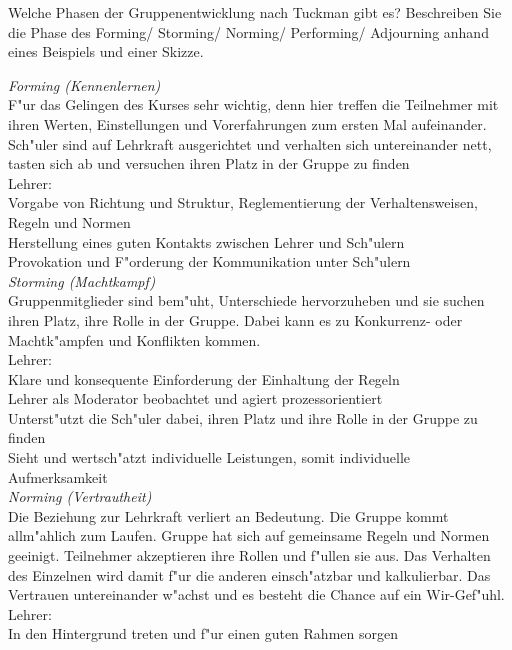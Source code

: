 \begin{question}{6}
Welche Phasen der Gruppenentwicklung nach Tuckman gibt es? Beschreiben Sie die Phase des Forming/ Storming/ Norming/ Performing/ Adjourning anhand eines Beispiels und einer Skizze.
\end{question}
\begin{solution}
\emph{Forming (Kennenlernen)}\\
F"ur das Gelingen des Kurses sehr wichtig, denn hier treffen die Teilnehmer mit ihren Werten, Einstellungen und Vorerfahrungen zum ersten Mal aufeinander.\\
Sch"uler sind auf Lehrkraft ausgerichtet und verhalten sich untereinander nett, tasten sich ab und versuchen ihren Platz in der Gruppe zu finden\\
Lehrer:\\
Vorgabe von Richtung und Struktur, Reglementierung der Verhaltensweisen, Regeln und Normen\\
Herstellung eines guten Kontakts zwischen Lehrer und Sch"ulern\\
Provokation und F"orderung der Kommunikation unter Sch"ulern\\ 
\emph{Storming (Machtkampf)}\\
Gruppenmitglieder sind bem"uht, Unterschiede hervorzuheben und sie suchen ihren Platz, ihre Rolle in der Gruppe. Dabei kann es zu Konkurrenz- oder Machtk"ampfen und Konflikten kommen.\\
Lehrer:\\
Klare und konsequente Einforderung der Einhaltung der Regeln\\
Lehrer als Moderator beobachtet und agiert prozessorientiert\\
Unterst"utzt die Sch"uler dabei, ihren Platz und ihre Rolle in der Gruppe zu finden\\
Sieht und wertsch"atzt individuelle Leistungen, somit individuelle Aufmerksamkeit\\
\emph{Norming (Vertrautheit)}\\
Die Beziehung zur Lehrkraft verliert an Bedeutung. Die Gruppe kommt allm"ahlich zum Laufen. Gruppe hat sich auf gemeinsame Regeln und Normen geeinigt. Teilnehmer akzeptieren ihre Rollen und f"ullen sie aus. Das Verhalten des Einzelnen wird damit f"ur die anderen einsch"atzbar und kalkulierbar. Das Vertrauen untereinander w"achst und es besteht die Chance auf ein Wir-Gef"uhl.\\
Lehrer:\\
In den Hintergrund treten und f"ur einen guten Rahmen sorgen\\

\end{solution}
